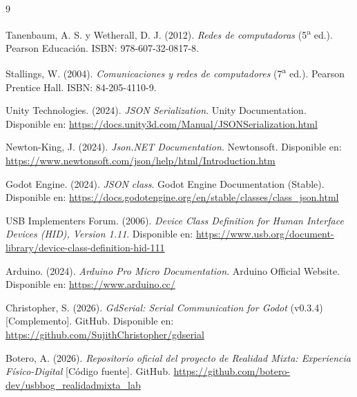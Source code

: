 \documentclass[journal]{IEEEtran}
\begin{document}
\begin{thebibliography}{9}

Tanenbaum, A. S. y Wetherall, D. J. (2012).
\textit{Redes de computadoras} (5\textsuperscript{a} ed.).
Pearson Educación. ISBN: 978-607-32-0817-8.

Stallings, W. (2004).
\textit{Comunicaciones y redes de computadores} (7\textsuperscript{a} ed.).
Pearson Prentice Hall. ISBN: 84-205-4110-9.

Unity Technologies. (2024).
\textit{JSON Serialization}. Unity Documentation.
Disponible en: \url{https://docs.unity3d.com/Manual/JSONSerialization.html}

Newton-King, J. (2024).
\textit{Json.NET Documentation}. Newtonsoft.
Disponible en: \url{https://www.newtonsoft.com/json/help/html/Introduction.htm}

Godot Engine. (2024).
\textit{JSON class}. Godot Engine Documentation (Stable).
Disponible en: \url{https://docs.godotengine.org/en/stable/classes/class_json.html}

USB Implementers Forum. (2006).
\textit{Device Class Definition for Human Interface Devices (HID), Version 1.11}.
Disponible en: \url{https://www.usb.org/document-library/device-class-definition-hid-111}

Arduino. (2024).
\textit{Arduino Pro Micro Documentation}. Arduino Official Website.
Disponible en: \url{https://www.arduino.cc/}

Christopher, S. (2026).
\textit{GdSerial: Serial Communication for Godot} (v0.3.4) [Complemento].
GitHub. Disponible en: \url{https://github.com/SujithChristopher/gdserial}

Botero, A. (2026).
\textit{Repositorio oficial del proyecto de Realidad Mixta: Experiencia Físico-Digital} [Código fuente].
GitHub. \url{https://github.com/botero-dev/usbbog_realidadmixta_lab}

\end{thebibliography}
\end{document}
